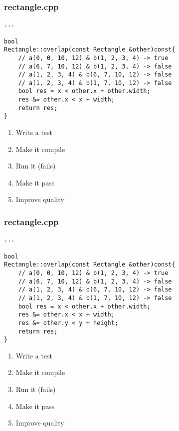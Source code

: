 \begin{frame}[fragile]
\frametitle{rectangle.cpp}
\begin{minipage}[t]{0.48\linewidth}
\begin{lstlisting}
...

bool 
Rectangle::overlap(const Rectangle &other)const{
    // a(0, 0, 10, 12) & b(1, 2, 3, 4) -> true
    // a(6, 7, 10, 12) & b(1, 2, 3, 4) -> false
    // a(1, 2, 3, 4) & b(6, 7, 10, 12) -> false
    // a(1, 2, 3, 4) & b(1, 7, 10, 12) -> false
    bool res = x < other.x + other.width;
    res &= other.x < x + width;
    return res;
}
\end{lstlisting}
\end{minipage}\hfill
\begin{minipage}[t]{0.28\linewidth}
  \small
  \begin{enumerate} 
    \item \textcolor{deadcolor}{Write a test}
    \item \textcolor{deadcolor}{Make it compile}
    \item \textcolor{deadcolor}{Run it (fails)}
    \item \textcolor{activecolor}{Make it pass}
    \item \textcolor{deadcolor}{Improve quality}
  \end{enumerate} 
\end{minipage}
\end{frame}


\begin{frame}[fragile]
\frametitle{rectangle.cpp}
\begin{minipage}[t]{0.48\linewidth}
\begin{lstlisting}
...

bool 
Rectangle::overlap(const Rectangle &other)const{
    // a(0, 0, 10, 12) & b(1, 2, 3, 4) -> true
    // a(6, 7, 10, 12) & b(1, 2, 3, 4) -> false
    // a(1, 2, 3, 4) & b(6, 7, 10, 12) -> false
    // a(1, 2, 3, 4) & b(1, 7, 10, 12) -> false
    bool res = x < other.x + other.width;
    res &= other.x < x + width;
    res &= other.y < y + height;
    return res;
}
\end{lstlisting}
\end{minipage}\hfill
\begin{minipage}[t]{0.28\linewidth}
  \small
  \begin{enumerate} 
    \item \textcolor{deadcolor}{Write a test}
    \item \textcolor{deadcolor}{Make it compile}
    \item \textcolor{deadcolor}{Run it (fails)}
    \item \textcolor{activecolor}{Make it pass}
    \item \textcolor{deadcolor}{Improve quality}
  \end{enumerate} 
\end{minipage}
\end{frame}



